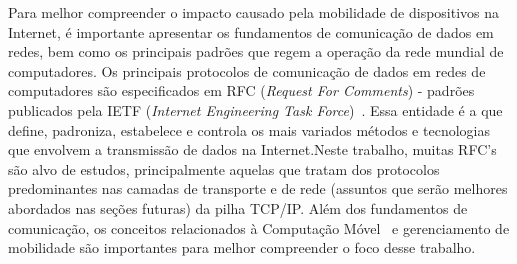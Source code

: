 \documentclass[	12pt, Times, openright, twoside, a4paper, english, brazil]{abntex2}
\begin{document}

Para melhor compreender o impacto causado pela mobilidade de dispositivos na Internet, é importante apresentar os fundamentos de comunicação de dados em redes, bem como os principais padrões que regem a operação da rede mundial de computadores. Os principais protocolos de comunicação de dados em redes de computadores são especificados em RFC (\textit{Request For Comments})
- padrões publicados pela IETF (\textit{Internet Engineering Task Force})~\cite{ietf}. Essa entidade é a que define, padroniza, estabelece e controla os mais variados métodos e tecnologias que envolvem a transmissão de dados na Internet.Neste trabalho, muitas RFC's são alvo de estudos, principalmente aquelas que tratam dos protocolos predominantes nas camadas de transporte e de rede (assuntos que serão melhores abordados nas seções futuras) da pilha TCP/IP. Além dos fundamentos de comunicação, os conceitos relacionados à Computação Móvel~\cite{mobilecomputing} e gerenciamento de mobilidade são importantes para melhor compreender o foco desse trabalho. 
\end{document}
